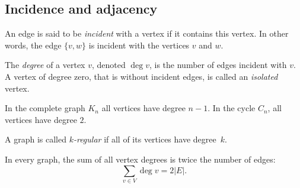 \begin{page}
\setcounter{section}{1}
\setcounter{subsection}{4}
\setcounter{dfn}{8}
\label{portion:168}

\subsection{Incidence and adjacency}
An edge is said to be \emph{incident} with a vertex if it contains this vertex.
In other words, the edge $\{v, w\}$ is incident with the vertices $v$ and $w$.

The \emph{degree} of a vertex $v$, denoted $\deg v$, is the number of edges incident with $v$.
A vertex of degree zero, that is without incident edges, is called an \emph{isolated} vertex.

In the complete graph $K_n$ all vertices have degree $n-1$.
In the cycle $C_n$, all vertices have degree $2$.


\end{page}

\begin{page}
\setcounter{section}{1}
\setcounter{subsection}{4}
\setcounter{dfn}{9}
\label{portion:170}

\begin{dfn}
A graph is called \emph{$k$-regular} if all of its vertices have degree~$k$.
\end{dfn}

\end{page}

\begin{page}
\setcounter{section}{1}
\setcounter{subsection}{4}
\setcounter{dfn}{9}
\label{portion:171}




\end{page}

\begin{page}
\setcounter{section}{1}
\setcounter{subsection}{4}
\setcounter{dfn}{10}
\label{portion:173}

\begin{thm}
\label{thm:Handshake}
In every graph, the sum of all vertex degrees is twice the number of edges:
\[
\sum_{v \in V} \deg v = 2 |E|.
\]
\end{thm}

\end{page}

